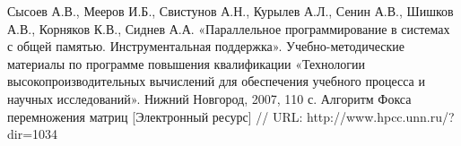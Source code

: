 \documentclass[12pt]{article}
\begin{document}
\newpage

\begin{thebibliography}{}
 Сысоев А.В., Мееров И.Б., Свистунов А.Н., Курылев А.Л., Сенин А.В., Шишков А.В., Корняков К.В., Сиднев А.А. «Параллельное программирование в системах с общей памятью. Инструментальная поддержка». Учебно-методические материалы по программе повышения квалификации «Технологии высокопроизводительных вычислений для обеспечения учебного процесса и научных исследований». Нижний Новгород, 2007, 110 с. 
 Алгоритм Фокса перемножения матриц [Электронный ресурс] // URL: http://www.hpcc.unn.ru/?dir=1034


\end{thebibliography}

\newpage
\end{document}

